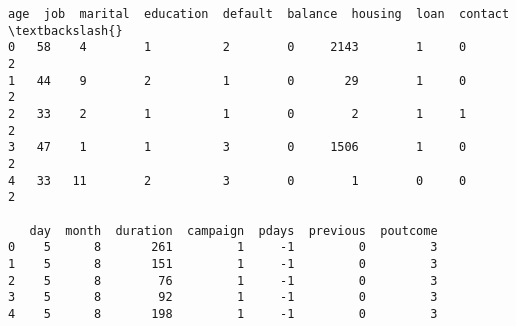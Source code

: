 \documentclass[11pt]{article}
\begin{document}
    \begin{Verbatim}[commandchars=\\\{\}]
   age  job  marital  education  default  balance  housing  loan  contact  \textbackslash{}
0   58    4        1          2        0     2143        1     0        2   
1   44    9        2          1        0       29        1     0        2   
2   33    2        1          1        0        2        1     1        2   
3   47    1        1          3        0     1506        1     0        2   
4   33   11        2          3        0        1        0     0        2   

   day  month  duration  campaign  pdays  previous  poutcome  
0    5      8       261         1     -1         0         3  
1    5      8       151         1     -1         0         3  
2    5      8        76         1     -1         0         3  
3    5      8        92         1     -1         0         3  
4    5      8       198         1     -1         0         3  

    \end{Verbatim}
\end{document}
